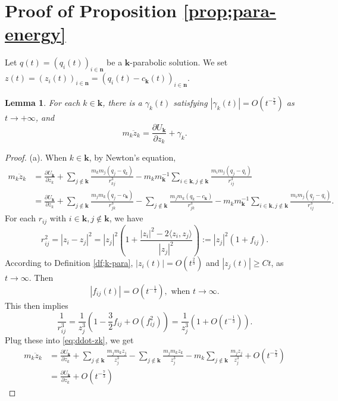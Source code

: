 \documentclass[11pt]{amsart}
\newtheorem{lemma}[theorem]{Lemma}
\theoremstyle{definition}
\theoremstyle{remark}
\numberwithin{equation}{section}
\newcommand{\gm}{\gamma}
\newcommand{\bn}{\mathbf n}
\newcommand{\bk}{\mathbf k}
\begin{document}
\section{Proof of Proposition \ref{prop;para-energy}} \label{sec:para-energy}
Let $q(t) = (q_i(t))_{i \in \bn}$ be a $\mathbf{k}$-parabolic solution. We set $z(t) = (z_i(t))_{i \in \bn}=(q_i(t)-c_{\mathbf{k}}(t))_{i \in \bn}$.
\begin{lemma}\label{lem;mut-dis}
    For each $k\in\mathbf{k}$, there is a $\gm_k(t)$ satisfying  $|\gamma_k(t)|=O(t^{-\frac{7}{3}})$ as $t\rightarrow+\infty$, and 
    \begin{equation}\label{eq;mutal-dist-eq}
        m_k\ddot{z}_k=\frac{\partial U_\mathbf{k}}{\partial z_k}+\gamma_k.
    \end{equation}
\end{lemma}
\begin{proof}
(a). When $k \in \bk$, by Newton's equation, 
\begin{equation}
 \label{eq;ddot-zk} \begin{aligned}
 m_k\ddot{z}_k&=\frac{\partial U_\mathbf{k}}{\partial z_k}+\sum_{j\notin\mathbf{k}}\frac{m_km_j(q_j-q_k)}{r_{kj}^3}-m_km_\mathbf{k}^{-1}\sum_{i\in\mathbf{k},j\notin\mathbf{k}}\frac{m_im_j(q_j-q_i)}{r_{ij}^3}\\
    &=\frac{\partial U_\mathbf{k}}{\partial z_k}+\sum_{j\notin\mathbf{k}}\frac{m_jm_k(q_j-c_{\mathbf{k}})}{r_{jk}^3}-\sum_{j\notin\mathbf{k}}\frac{m_jm_k(q_k-c_{\mathbf{k}})}{r_{jk}^3}-m_km_\mathbf{k}^{-1}\sum_{i\in\mathbf{k},j\notin\mathbf{k}}\frac{m_im_j(q_j-q_i)}{r_{ij}^3}.
 \end{aligned}
 \end{equation}  
For each $r_{ij}$ with $i\in\mathbf{k}, j\notin\mathbf{k}$, we have
$$ r_{ij}^2 = |z_i -z_j|^2 = |z_j|^2 \left( 1+ \frac{|z_i|^2 - 2 \langle z_i, z_j\rangle}{|z_j|^2} \right) := |z_j|^2( 1 + f_{ij}). $$
According to Definition \ref{df;k-para}, $|z_i(t)|=O(t^{\frac{2}{3}})$ and $|z_j(t)|\ge Ct$, as $t\rightarrow \infty$. Then
$$|f_{ij}(t)|=O(t^{-\frac{1}{3}}), \text{ when } t \to \infty.$$
This then implies 
\begin{equation*}
    \frac{1}{r_{ij}^3}=\frac{1}{z_{j}^3}(1-\frac{3}{2}f_{ij}+O(f_{ij}^2))=\frac{1}{z_j^3}(1+O(t^{-\frac{1}{3}})).
\end{equation*}
Plug these into \eqref{eq;ddot-zk}, we get  
\begin{align*}
    m_k\ddot{z}_k&=\frac{\partial U_\mathbf{k}}{\partial z_k}+\sum_{j\notin\mathbf{k}}\frac{m_jm_kz_j}{z_j^3}-\sum_{j\notin\mathbf{k}}\frac{m_jm_kz_k}{z_j^3}-m_k\sum_{j\notin\mathbf{k}}\frac{m_jz_j}{z_j^3}+O(t^{-\frac{7}{3}})\\
    &=\frac{\partial U_\mathbf{k}}{\partial z_k}+O(t^{-\frac{7}{3}}) 
\end{align*}
\end{proof}
\end{document}
